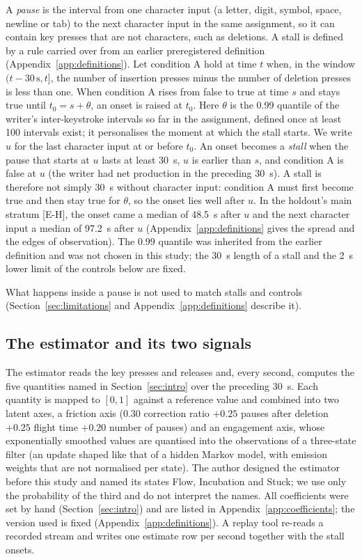 A \emph{pause} is the interval from one character input (a letter, digit, symbol, space, newline or tab) to the next
character input in the same assignment, so it can contain key presses that are not characters, such as deletions. A
stall is defined by a rule carried over from an earlier preregistered definition (Appendix~\ref{app:definitions}). Let
condition A hold at time $t$ when, in the window $(t - 30\,\mathrm{s}, t]$, the number of insertion presses minus the
number of deletion presses is less than one. When condition A rises from false to true at time $s$ and stays true until
$t_0 = s + \theta$, an onset is raised at $t_0$. Here $\theta$ is the 0.99 quantile of the writer's inter-keystroke
intervals so far in the assignment, defined once at least 100 intervals exist; it personalises the moment at which the
stall starts. We write $u$ for the last character input at or before $t_0$. An onset becomes a \emph{stall} when the
pause that starts at $u$ lasts at least 30~s, $u$ is earlier than $s$, and condition A is false at $u$ (the writer had
net production in the preceding 30~s). A stall is therefore not simply 30~s without character input: condition A must
first become true and then stay true for $\theta$, so the onset lies well after $u$. In the holdout's main stratum
[E-H], the onset came a median of 48.5~s after $u$ and the next character input a median of 97.2~s after $u$
(Appendix~\ref{app:definitions} gives the spread and the edges of observation). The 0.99 quantile was inherited from the earlier definition and was not chosen
in this study; the 30~s length of a stall and the 2~s lower limit of the controls below are fixed.

What happens inside a pause is not used to match stalls and controls (Section~\ref{sec:limitations} and
Appendix~\ref{app:definitions} describe it).

\subsection{The estimator and its two signals}

The estimator reads the key presses and releases and, every second, computes the five quantities named in
Section~\ref{sec:intro} over the preceding 30~s. Each quantity is mapped to $[0, 1]$ against a reference value and combined into two latent axes, a friction
axis ($0.30$ correction ratio $+ 0.25$ pauses after deletion $+ 0.25$ flight time $+ 0.20$ number of pauses) and an
engagement axis, whose exponentially smoothed values are quantised into the observations of a three-state filter (an update shaped
like that of a hidden Markov model, with emission weights that are not normalised per state). The author designed the estimator before this study and named its states Flow, Incubation and Stuck; we use only the
probability of the third and do not interpret the names. All coefficients were set by hand (Section~\ref{sec:intro}) and are listed in
Appendix~\ref{app:coefficients}; the version used is fixed (Appendix~\ref{app:definitions}). A replay tool re-reads a recorded stream and writes one
estimate row per second together with the stall onsets.

